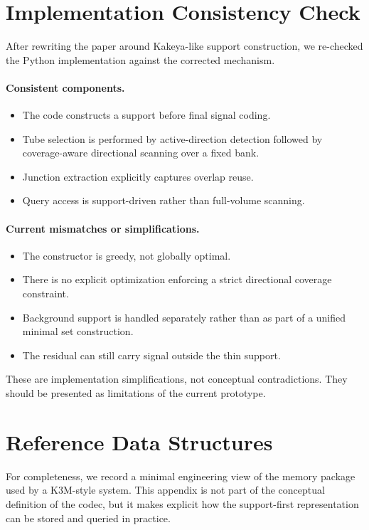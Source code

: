 \documentclass[11pt]{article}
\begin{document}
\appendix

\section{Implementation Consistency Check}
After rewriting the paper around Kakeya-like support construction, we re-checked the Python implementation against the corrected mechanism.

\paragraph{Consistent components.}
\begin{itemize}[leftmargin=1.5em]
\item The code constructs a support before final signal coding.
\item Tube selection is performed by active-direction detection followed by coverage-aware directional scanning over a fixed bank.
\item Junction extraction explicitly captures overlap reuse.
\item Query access is support-driven rather than full-volume scanning.
\end{itemize}

\paragraph{Current mismatches or simplifications.}
\begin{itemize}[leftmargin=1.5em]
\item The constructor is greedy, not globally optimal.
\item There is no explicit optimization enforcing a strict directional coverage constraint.
\item Background support is handled separately rather than as part of a unified minimal set construction.
\item The residual can still carry signal outside the thin support.
\end{itemize}

These are implementation simplifications, not conceptual contradictions. They should be presented as limitations of the current prototype.

\section{Reference Data Structures}
For completeness, we record a minimal engineering view of the memory package used by a K3M-style system. This appendix is not part of the conceptual definition of the codec, but it makes explicit how the support-first representation can be stored and queried in practice.
\end{document}
